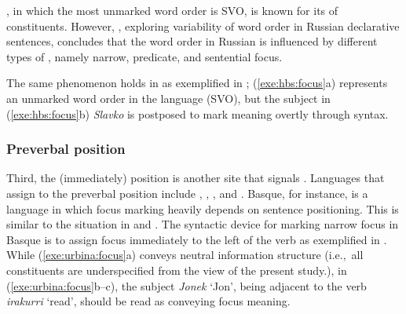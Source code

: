 \noindent {}, in which the most unmarked word order is SVO,
is known for its  of constituents.  However,
\citet{rodionova:01}, exploring variability of word order in Russian
declarative sentences, concludes that the word order in Russian is
influenced by different types of , namely narrow, predicate, and
sentential focus.


The same phenomenon holds in  as
exemplified in ; (\ref{exe:hbs:focus}a)
represents an unmarked word order in the language (SVO), but the
subject in (\ref{exe:hbs:focus}b) \textit{Slavko} is postposed to mark
 meaning overtly through syntax.







\subsubsection{Preverbal position}
\label{4:sssec:preverbal}

Third, the (immediately)  position is another site that
signals . Languages that assign  to the preverbal
position include  \citep{urbina:99}, 
\citep{kiss:98,szendroi:01},  \citep{icssever:03}, and
\citep{comrie:84,tamrazian:91,tamrazian:94,tragut:09,megerdoomian:11}.
Basque, for instance, is a language in which focus marking heavily
depends on sentence positioning. This is similar to the situation in
 \citep{vallduvi:92,engdahl:vallduvi:96} and  \citep{kugler:etal:07}. The syntactic device for marking
narrow focus in Basque is to assign focus immediately to the left of
the verb as exemplified in . While
(\ref{exe:urbina:focus}a) conveys neutral information structure
(i.e.,\ all constituents are underspecified from the view of the
present study.), in (\ref{exe:urbina:focus}b--c), the subject
\textit{Jonek} `Jon', being adjacent to the verb \textit{irakurri}
`read', should be read as conveying focus meaning.


